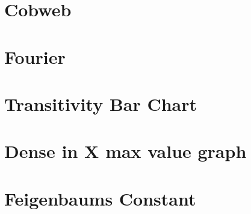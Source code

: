 \documentclass[9pt, a4paper]{report}
\begin{document}
\begin{appendices}
\section{Cobweb}
\label{appendix:cobweb}


\section{Fourier}
\label{appendix:fourier}


\section{Transitivity Bar Chart}
\label{appendix:transitivity}


\section{Dense in X max value graph}
\label{appendix:maxvalue}


\section{Feigenbaums Constant}
\label{appendix:feigenconst}


\end{appendices}
\end{document}

